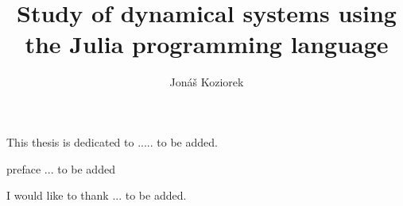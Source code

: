 \documentclass[12pt]{cwru_thesis}
\begin{document}

\title{Study of dynamical systems using the Julia programming language} %
\author{Jonáš Koziorek} %



\maketitle[logo]

\begin{dedication} 	 
    This thesis is dedicated to ..... to be added.
\end{dedication}

\begin{KeepFromToc}
  \tableofcontents
\end{KeepFromToc}
\listoftables
\listoffigures

\begin{preface}
    preface ... to be added
\end{preface}

\begin{acknowledgements}
    I would like to thank ... to be added.
\end{acknowledgements}

\printglossary[type=\acronymtype, title=List of Abbreviations]

\printnomenclature
\end{document}
